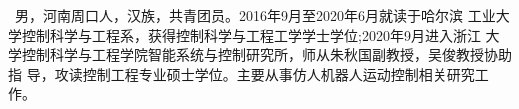 \cleardoublepage
{}

\par\noindent 
\parbox[t]{\linewidth}{
\noindent{}
\
男，河南周口人，汉族，共青团员。2016年9月至2020年6月就读于哈尔滨
工业大学控制科学与工程系，获得控制科学与工程工学学士学位;2020年9月进入浙江
大学控制科学与工程学院智能系统与控制研究所，师从朱秋国副教授，吴俊教授协助指
导，攻读控制工程专业硕士学位。主要从事仿人机器人运动控制相关研究工作。}
\vspace{4\baselineskip}

\cleardoublepage
{}